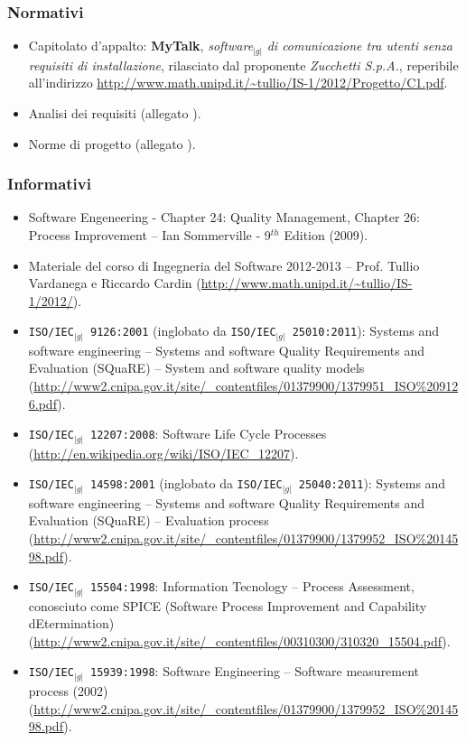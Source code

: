 {{	\subsubsection{Normativi}{
	    \begin{itemize}
		\item Capitolato d'appalto: \textbf{MyTalk}, \textit{software}$_{|g|}$ \textit{di comunicazione tra utenti senza requisiti  di installazione}, rilasciato dal 
		      proponente \textit{Zucchetti S.p.A.}, reperibile all'indirizzo \url{http://www.math.unipd.it/~tullio/IS-1/2012/Progetto/C1.pdf}.
		\item Analisi dei requisiti (allegato \textit{\AnalisiDeiRequisiti}).
		\item Norme di progetto (allegato \textit{\NormeDiProgetto}).
	    \end{itemize}
	}
	\subsubsection{Informativi}{
	    \begin{itemize}
		\item Software Engeneering - Chapter 24: Quality Management, Chapter 26: Process Improvement -- Ian Sommerville - 9$^{th}$ Edition (2009).
		\item Materiale del corso di Ingegneria del Software 2012-2013 -- Prof. Tullio Vardanega e Riccardo Cardin
		      (\url {http://www.math.unipd.it/~tullio/IS-1/2012/}).
		\item \texttt{ISO/IEC$_{|g|}$ 9126:2001} (inglobato da \texttt{ISO/IEC$_{|g|}$ 25010:2011}): 
		      Systems and software engineering -- Systems and software Quality Requirements and Evaluation (SQuaRE) 
		      -- System and software quality models  (\url{http://www2.cnipa.gov.it/site/_contentfiles/01379900/1379951_ISO\%209126.pdf}).
		\item \texttt{ISO/IEC$_{|g|}$ 12207:2008}: Software Life Cycle Processes (\url{http://en.wikipedia.org/wiki/ISO/IEC_12207}).
		\item \texttt{ISO/IEC$_{|g|}$ 14598:2001} (inglobato da \texttt{ISO/IEC$_{|g|}$ 25040:2011}): Systems and software engineering -- 
		      Systems and software Quality Requirements and Evaluation (SQuaRE) -- Evaluation process
		      (\url{http://www2.cnipa.gov.it/site/_contentfiles/01379900/1379952_ISO\%2014598.pdf}).
		\item \texttt{ISO/IEC$_{|g|}$ 15504:1998}: Information Tecnology -- Process Assessment, conosciuto come SPICE (Software Process Improvement and 
		      Capability dEtermination) (\url{http://www2.cnipa.gov.it/site/_contentfiles/00310300/310320_15504.pdf}).
		\item \texttt{ISO/IEC$_{|g|}$ 15939:1998}: Software Engineering -- Software measurement process (2002) (\url{http://www2.cnipa.gov.it/site/_contentfiles/01379900/1379952_ISO\%2014598.pdf}).
	    \end{itemize}

	}
    }
}
